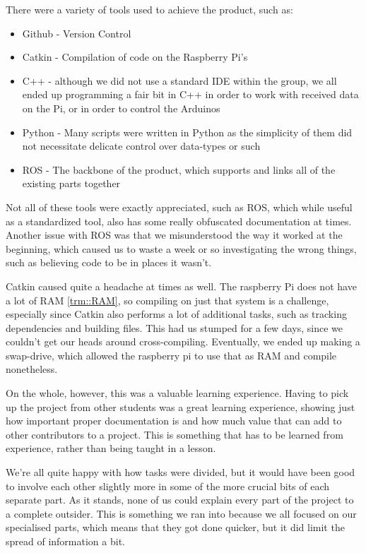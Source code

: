 There were a variety of tools used to achieve the product, such as:
\begin{itemize}
\item Github - Version Control
\item Catkin - Compilation of code on the Raspberry Pi's
\item C++ - although we did not use a standard IDE within the group, we all ended up programming a fair bit in C++ in order to work with received data on the Pi, or in order to control the Arduinos
\item Python - Many scripts were written in Python as the simplicity of them did not necessitate delicate control over data-types or such
\item ROS - The backbone of the product, which supports and links all of the existing parts together
\end{itemize}
Not all of these tools were exactly appreciated, such as ROS, which while useful as a standardized tool, also has some really obfuscated documentation at times.
Another issue with ROS was that we misunderstood the way it worked at the beginning, which caused us to waste a week or so investigating the wrong things, such as believing code to be in places it wasn't.

Catkin caused quite a headache at times as well.
The raspberry Pi does not have a lot of RAM \ref{trm::RAM}, so compiling on just that system is a challenge, especially since Catkin also performs a lot of additional tasks, such as tracking dependencies and building files.
This had us stumped for a few days, since we couldn't get our heads around cross-compiling.
Eventually, we ended up making a swap-drive, which allowed the raspberry pi to use that as RAM and compile nonetheless.

On the whole, however, this was a valuable learning experience.
Having to pick up the project from other students was a great learning experience, showing just how important proper documentation is and how much value that can add to other contributors to a project.
This is something that has to be learned from experience, rather than being taught in a lesson.

We're all quite happy with how tasks were divided, but it would have been good to involve each other slightly more in some of the more crucial bits of each separate part.
As it stands, none of us could explain every part of the project to a complete outsider.
This is something we ran into because we all focused on our specialised parts, which means that they got done quicker, but it did limit the spread of information a bit.

\newpage
